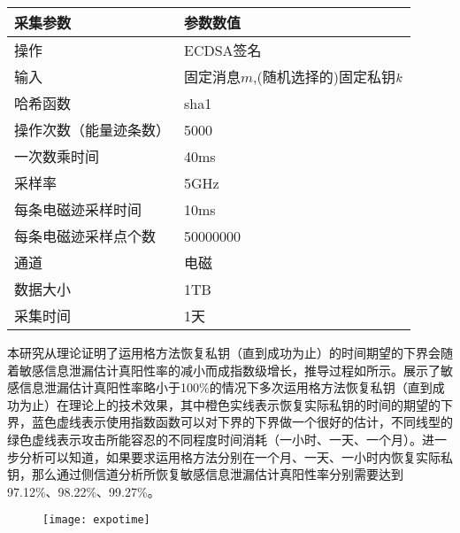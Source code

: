 {	\begin{table}[!h]
		\label{tab:acquisitionpara}
		\centering
		\begin{tabular}{ll}                                                               
			\hline   
			采集参数&参数数值\\                                                          
			\hline
			操作 & ECDSA签名\\
			输入 & 固定消息$m$,(随机选择的)固定私钥$k$\\
			哈希函数& sha1\citep{FIPS180-4}\\
			操作次数（能量迹条数） & 5000\\
			一次数乘时间 & 40ms\\
			采样率 & 5GHz\\
			每条电磁迹采样时间 & 10ms\\
			每条电磁迹采样点个数 & 50000000\\
			通道 & 电磁\\
			数据大小 & 1TB\\
			采集时间 & 1天\\
			\hline
		\end{tabular}
	\end{table}

	
	本研究从理论证明了运用格方法恢复私钥（直到成功为止）的时间期望的下界会随着敏感信息泄漏估计真阳性率的减小而成指数级增长，推导过程如所示。展示了敏感信息泄漏估计真阳性率略小于100\%的情况下多次运用格方法恢复私钥（直到成功为止）在理论上的技术效果，其中橙色实线表示恢复实际私钥的时间的期望的下界，蓝色虚线表示使用指数函数可以对下界的下界做一个很好的估计，不同线型的绿色虚线表示攻击所能容忍的不同程度时间消耗（一小时、一天、一个月）。进一步分析可以知道，如果要求运用格方法分别在一个月、一天、一小时内恢复实际私钥，那么通过侧信道分析所恢复敏感信息泄漏估计真阳性率分别需要达到97.12\%、98.22\%、99.27\%。
	
	\begin{figure}[!h]
		\begin{center}
			\texttt{[image: expotime]}
			\label{fig:expotime}
		\end{center}
	\end{figure}

}

